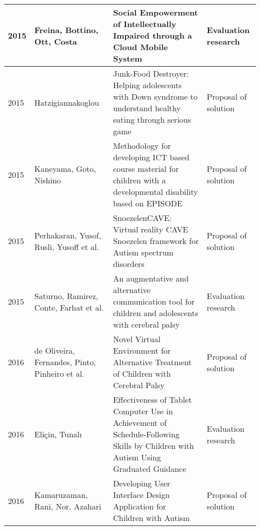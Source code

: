 \documentclass[utf8,english]{gradu3}
\begin{document}
\begin{longtable}{|>{\scriptsize}l|>{\scriptsize}p{3cm}|>{\scriptsize}p{8cm}|>{\scriptsize}p{2.4cm}|}
  2015          & Freina, Bottino, Ott, Costa                                          & Social Empowerment of Intellectually Impaired through a Cloud Mobile System                                                                                                                  & Evaluation research        \\ \hline
  2015          & Hatzigiannakoglou                                                    & Junk-Food Destroyer: Helping adolescents with Down syndrome to understand healthy eating through serious game                                                                                & Proposal of solution       \\ \hline
  2015          & Kaneyama, Goto, Nishino                                              & Methodology for developing ICT based course material for children with a developmental disability based on EPISODE                                                                           & Proposal of solution       \\ \hline
  2015          & Perhakaran, Yusof, Rusli, Yusoff et al.                              & SnoezelenCAVE: Virtual reality CAVE Snoezelen framework for Autism spectrum disorders                                                                                                        & Proposal of solution       \\ \hline
  2015          & Saturno, Ramirez, Conte, Farhat et al.                               & An augmentative and alternative communication tool for children and adolescents with cerebral palsy                                                                                          & Evaluation research        \\ \hline
  2016          & de Oliveira, Fernandes, Pinto, Pinheiro et al.                       & Novel Virtual Environment for Alternative Treatment of Children with Cerebral Palsy                                                                                                          & Proposal of solution       \\ \hline
  2016          & Eliçin, Tunalı                                                       & Effectiveness of Tablet Computer Use in Achievement of Schedule-Following Skills by Children with Autism Using Graduated Guidance                                                            & Evaluation research        \\ \hline
  2016          & Kamaruzaman, Rani, Nor, Azahari                                      & Developing User Interface Design Application for Children with Autism                                                                                                                        & Proposal of solution       \\ \hline

\end{longtable}
\end{document}

